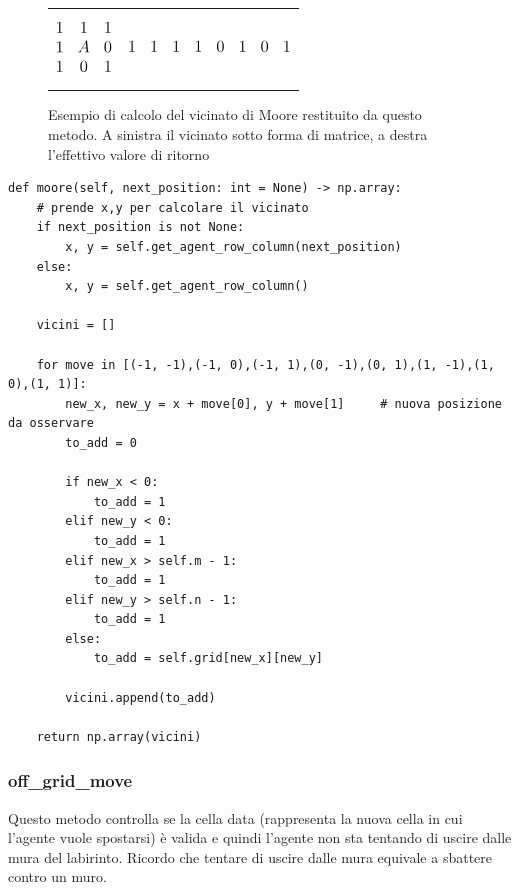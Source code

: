 \begin{figure}[H]
	\begin{tabular}{m{20em} m{20em}}
		\begin{equation*}
			\large
			\begin{matrix}
				1 & 1 & 1\\
				1 & A & 0\\
				1 & 0 & 1\\
			\end{matrix}
		\end{equation*}
		&
		\begin{equation*}
			\large
			\begin{matrix}
				1 & 1 & 1 & 1 & 0 & 1 & 0 & 1
			\end{matrix}
		\end{equation*}
	\end{tabular}
	\caption{Esempio di calcolo del vicinato di Moore restituito da questo metodo. A sinistra il vicinato sotto forma di matrice, a destra l'effettivo valore di ritorno}
\end{figure}

\begin{lstlisting}[style=python, caption={Metodo che calcola il vicinato di Moore}]
def moore(self, next_position: int = None) -> np.array:
	# prende x,y per calcolare il vicinato
	if next_position is not None:
		x, y = self.get_agent_row_column(next_position)
	else:
		x, y = self.get_agent_row_column()

	vicini = []

	for move in [(-1, -1),(-1, 0),(-1, 1),(0, -1),(0, 1),(1, -1),(1, 0),(1, 1)]:
		new_x, new_y = x + move[0], y + move[1]     # nuova posizione da osservare
		to_add = 0

		if new_x < 0:
			to_add = 1
		elif new_y < 0:
			to_add = 1
		elif new_x > self.m - 1:
			to_add = 1
		elif new_y > self.n - 1:
			to_add = 1
		else:
			to_add = self.grid[new_x][new_y]

		vicini.append(to_add)

	return np.array(vicini)
\end{lstlisting}

\subsubsection{off\_grid\_move}
Questo metodo controlla se la cella data (rappresenta la nuova cella in cui l'agente vuole spostarsi) \`{e} valida e quindi l'agente non sta tentando di uscire dalle mura del labirinto. Ricordo che tentare di uscire dalle mura equivale a sbattere contro un muro.\\

